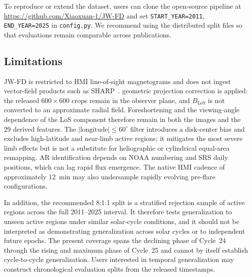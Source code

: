 \documentclass[universe,article,submit,moreauthors]{Definitions/mdpi}
\newif\ifrevision
\newcommand{\add}[1]{\ifrevision\textcolor{blue}{#1}\else#1\fi}
\newcommand{\del}[1]{\ifrevision\textcolor{red}{\sout{#1}}\else\fi}
\begin{document}
To reproduce or extend the dataset, users can clone the open-source pipeline at \url{https://github.com/Xiaoxuan-1/JW-FD} and set \texttt{START\_YEAR=2011}, \texttt{END\_YEAR=2025} in \texttt{config.py}. We recommend using the distributed split files so that evaluations remain comparable across publications. \del{Those files implement the 19-AR rebalance of the official split; models trained on the seed-62 membership cannot be evaluated on the released test set.}

\subsection{Limitations}
\label{sec:limitations}

JW-FD is restricted to HMI line-of-sight magnetograms and does not ingest vector-field products such as SHARP~\cite{Bobra2014}. \del{The source full-disk frames include limb-darkening correction, but no} geometric projection correction is applied: the released $600\times600$ crops remain in the observer plane, and $B_{\mathrm{LoS}}$ is not converted to an approximate radial field. Foreshortening and the viewing-angle dependence of the LoS component therefore remain in both the images and the 29 derived features. The $|\mathrm{longitude}| \le 60^\circ$ filter introduces a disk-center bias and excludes high-latitude and near-limb active regions; it mitigates the most severe limb effects but is not a substitute for heliographic or cylindrical equal-area remapping. AR identification depends on NOAA numbering and SRS daily positions, which can lag rapid flux emergence. The native HMI cadence of approximately 12~min may also undersample rapidly evolving pre-flare configurations.

In addition, the recommended 8:1:1 split is a stratified rejection sample of active regions across the full 2011--2025 interval\del{, with a subsequent 19-AR adjustment that balances rare-class positives between validation and test}. It therefore tests generalization to unseen active regions under similar solar-cycle conditions, and it should not be interpreted as demonstrating generalization across solar cycles or to independent future epochs. The present coverage spans the declining phase of Cycle~24 through the rising and maximum phase of Cycle~25 and cannot by itself establish cycle-to-cycle generalization. Users interested in temporal generalization may construct chronological evaluation splits from the released timestamps.
\end{document}
